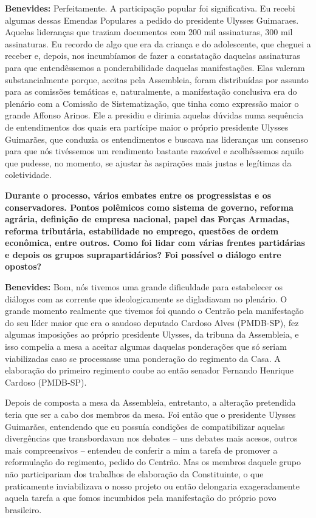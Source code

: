 \textbf{Benevides:} Perfeitamente. A participação popular foi
significativa. Eu recebi algumas dessas Emendas Populares a pedido do
presidente Ulysses Guimaraes. Aquelas lideranças que traziam documentos
com 200 mil assinaturas, 300 mil assinaturas. Eu recordo de algo que era
da criança e do adolescente, que cheguei a receber e, depois, nos
incumbíamos de fazer a constatação daquelas assinaturas para que
entendêssemos a ponderabilidade daquelas manifestações. Elas valeram
substancialmente porque, aceitas pela Assembleia, foram distribuídas por
assunto para as comissões temáticas e, naturalmente, a manifestação
conclusiva era do plenário com a Comissão de Sistematização, que tinha
como expressão maior o grande Affonso Arinos. Ele a presidiu e dirimia
aquelas dúvidas numa sequência de entendimentos dos quais era partícipe
maior o próprio presidente Ulysses Guimarães, que conduzia os
entendimentos e buscava nas lideranças um consenso para que nós
tivéssemos um rendimento bastante razoável e acolhêssemos aquilo que
pudesse, no momento, se ajustar às aspirações mais justas e legítimas da
coletividade.

\textbf{Durante o processo, vários embates entre os progressistas e os
conservadores. Pontos polêmicos como sistema de governo, reforma
agrária, definição de empresa nacional, papel das Forças Armadas,
reforma tributária, estabilidade no emprego, questões de ordem
econômica, entre outros. Como foi lidar com várias frentes partidárias e
depois os grupos suprapartidários? Foi possível o diálogo entre
opostos?}

\textbf{Benevides:} Bom, nós tivemos uma grande dificuldade para
estabelecer os diálogos com as corrente que ideologicamente se
digladiavam no plenário. O grande momento realmente que tivemos foi
quando o Centrão pela manifestação do seu líder maior que era o saudoso
deputado Cardoso Alves (PMDB-SP), fez algumas imposições ao próprio
presidente Ulysses, da tribuna da Assembleia, e isso compelia a mesa a
aceitar algumas daquelas ponderações que só seriam viabilizadas caso se
processasse uma ponderação do regimento da Casa. A elaboração do
primeiro regimento coube ao então senador Fernando Henrique Cardoso
(PMDB-SP).

Depois de composta a mesa da Assembleia, entretanto, a alteração
pretendida teria que ser a cabo dos membros da mesa. Foi então que o
presidente Ulysses Guimarães, entendendo que eu possuía condições de
compatibilizar aquelas divergências que transbordavam nos debates -- uns
debates mais acesos, outros mais compreensivos -- entendeu de conferir a
mim a tarefa de promover a reformulação do regimento, pedido do Centrão.
Mas os membros daquele grupo não participariam dos trabalhos de
elaboração da Constituinte, o que praticamente inviabilizava o nosso
projeto ou então delongaria exageradamente aquela tarefa a que fomos
incumbidos pela manifestação do próprio povo brasileiro.

